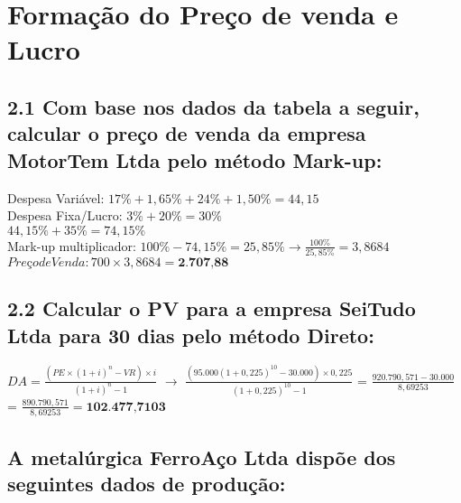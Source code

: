 \documentclass[report]{uftex}
\begin{document}
\chapter{Formação do Preço de venda e Lucro}

\section{2.1 Com base nos dados da tabela a seguir, calcular o preço de venda da empresa MotorTem Ltda pelo método Mark-up:}

Despesa Variável: $17\% + 1,65\% + 24\% + 1,50\% = 44,15$ \\ 
Despesa Fixa/Lucro: $3\% + 20\% = 30\%$ \\
$44,15\% + 35\% = 74,15\%$  \\
Mark-up multiplicador: $100\% - 74,15\% = 25,85\% \rightarrow \frac{100\%}{25,85\%} = 3,8684$ \\
$Preço de Venda: 700 \times 3,8684 = \textbf{2.707,88}$ 

\section{2.2 Calcular o PV para a empresa SeiTudo Ltda para 30 dias pelo método Direto:}

$DA = \frac{(PE \times (1+i)^n - VR) \times i}{(1+i)^n -1}$ $\rightarrow$ $\frac{(95.000(1+0,225)^{10}-30.000) \times 0,225}{(1+0,225)^{10}-1}$ = $\frac{920.790,571 - 30.000}{8,69253}$ = $\frac{890.790,571}{8,69253} = \textbf{102.477,7103}$

\section{A metalúrgica FerroAço Ltda dispõe dos seguintes dados de produção:}
\end{document}
